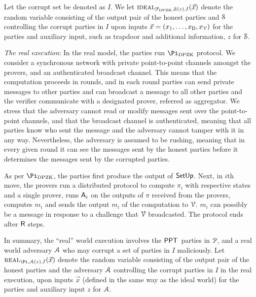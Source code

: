 Let the corrupt set be denoted as $I$. We let $\textsc{ideal}_{\mathcal{F}_{\text{DPZK}}, \mathcal{S}(z),I}(\vec{x})$ denote the random variable consisting of the output pair of the honest parties and  $\mathcal{S}$ controlling the corrupt parties in $I$ upon inputs $\vec{x} = (x_1  ,\ldots,x_{\mathsf{D}},x_{\mathcal{V}})$ for the parties and auxiliary input, such as trapdoor and additional information, $z$ for $\mathcal{S}$.  

\noindent\textit{The real execution}: In the real model, the parties run $\Pi_\DPZK$ protocol.  We consider a synchronous network with private point-to-point channels amongst the provers, and an authenticated broadcast channel. This means that the computation proceeds in rounds, and in each round parties can send private messages to other parties and can broadcast a message to all other parties and the verifier communicate with a designated prover, referred as aggregator. We stress that the adversary cannot read or modify messages sent over the point-to-point channels, and that the broadcast channel is authenticated, meaning that all parties know who sent the message and the adversary cannot tamper with it in any way. Nevertheless, the adversary is assumed to be rushing, meaning that in every given round it can see the messages sent by the honest parties before it determines the messages sent by the corrupted parties. 

As per $\Pi_\DPZK$, the parties first produce the output of $\mathsf{SetUp}$. Next, in $i$th move,  the  provers run a distributed protocol to compute $\pi_i$ with respective states and a single prover, runs $\mathsf{A}_i$ on the outputs of $\pi$ received from the provers, computes $m_i$ and sends the output $m_i$ of the computation to $\mathcal{V}$. $m_i$ can possibly be  a message in response to a challenge that $\mathcal{V}$ broadcasted. The protocol ends after $\mathsf{R}$ steps.

In summary,  the ``real'' world execution involves the $\mathsf{PPT}$\ parties  in $\mathcal{P}$,  and a real world adversary $\mathcal{A}$ who may corrupt  a set of parties in $I$ maliciously.  Let $\Real_{\Pi, \Adv(z),I}(\vec{x})$ denote the random variable consisting of the output pair of the honest parties and the adversary $\mathcal{A}$ controlling the corrupt parties in $I$ in the real execution, upon inputs $\vec{x}$ (defined in the same way as the ideal world) for the parties and auxiliary input $z$ for $\mathcal{A}$. 

